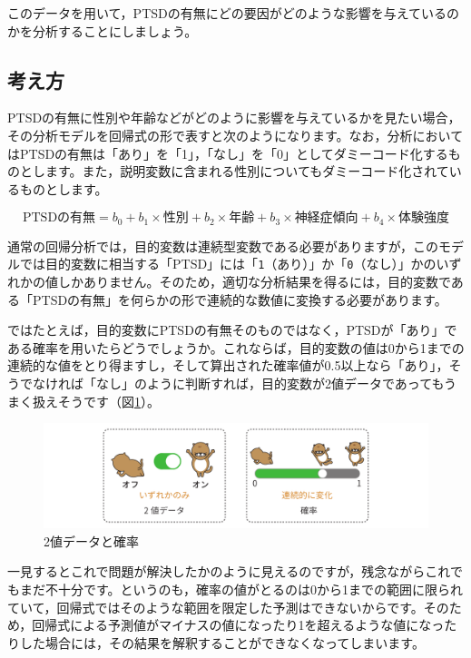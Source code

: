 \documentclass[
  12pt,
  a5jpaper,
  lualatex, ja=standard]{bxjsbook}
\begin{document}
このデータを用いて，PTSDの有無にどの要因がどのような影響を与えているのかを分析することにしましょう。

\hypertarget{sub:regression-binomial}{%
\subsection{考え方}\label{sub:regression-binomial}}

PTSDの有無に性別や年齢などがどのように影響を与えているかを見たい場合，その分析モデルを回帰式の形で表すと次のようになります。なお，分析においてはPTSDの有無は「あり」を「1」，「なし」を「0」としてダミーコード化するものとします。また，説明変数に含まれる性別についてもダミーコード化されているものとします。

\[
\text{PTSDの有無} = b_0 + b_1 \times \text{性別} + b_2 \times \text{年齢}+ b_3 \times \text{神経症傾向}+ b_4 \times \text{体験強度}
\]

通常の回帰分析では，目的変数は連続型変数である必要がありますが，このモデルでは目的変数に相当する「PTSD」には「\texttt{1}（あり）」か「\texttt{0}（なし）」かのいずれかの値しかありません。そのため，適切な分析結果を得るには，目的変数である「PTSDの有無」を何らかの形で連続的な数値に変換する必要があります。

ではたとえば，目的変数にPTSDの有無そのものではなく，PTSDが「あり」である確率を用いたらどうでしょうか。これならば，目的変数の値は0から1までの連続的な値をとり得ますし，そして算出された確率値が0.5以上なら「あり」，そうでなければ「なし」のように判断すれば，目的変数が2値データであってもうまく扱えそうです（図\ref{fig:regression-binomial-probability}）。

\begin{figure}[!ht]

{\centering \includegraphics[width=1\linewidth]{images/regression/binomial-probability} 

}

\caption{2値データと確率}\label{fig:regression-binomial-probability}
\end{figure}

一見するとこれで問題が解決したかのように見えるのですが，残念ながらこれでもまだ不十分です。というのも，確率の値がとるのは0から1までの範囲に限られていて，回帰式ではそのような範囲を限定した予測はできないからです。そのため，回帰式による予測値がマイナスの値になったり1を超えるような値になったりした場合には，その結果を解釈することができなくなってしまいます。
\end{document}
